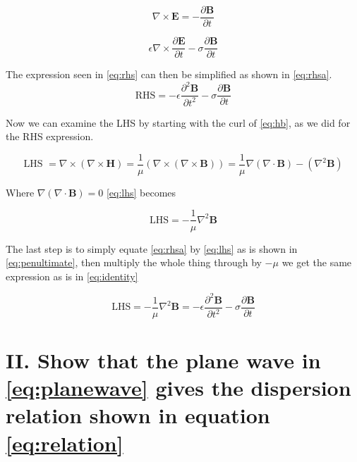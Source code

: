 \documentclass[12pt]{article}
\begin{document}
\begin{equation}
\label{eq:maxwell3}
\nabla \times \mathbf{E} = - \frac{\partial \mathbf{B}} {\partial t}
\end{equation}

\begin{equation}
\label{eq:rhs}
\epsilon \nabla \times\frac{\partial \mathbf{E}} {\partial t} -\sigma\frac{\partial \mathbf{B}} {\partial t} 
\end{equation}

The expression seen in \cref{eq:rhs}  can then be simplified as shown in \cref{eq:rhsa}.
\begin{equation}
\label{eq:rhsa}
\text{RHS}=-\epsilon\frac{\partial^{2} \mathbf{B}} {\partial t^{2}} - \sigma\frac{\partial \mathbf{B}} {\partial t}
\end{equation}

\noindent
Now we can examine the LHS by starting with the curl of \cref{eq:hb}, as we did for the RHS expression.

\begin{equation}
\label{eq:lhs}
\text{LHS }=\nabla \times (\nabla \times \mathbf{H} )=\frac{1}{\mu}(\nabla \times (\nabla \times \mathbf{B} ))=\frac{1}{\mu}\nabla(\nabla\cdot\mathbf{B})-(\nabla^{2}\mathbf{B})
\end{equation}

\noindent
Where $\nabla(\nabla\cdot\mathbf{B})=0$ \cref{eq:lhs} becomes 

\begin{equation}
\text{LHS}=-\frac{1}{\mu}\nabla^{2}\mathbf{B}
\end{equation}

\noindent
The last step is to simply equate \cref{eq:rhsa} by  \cref{eq:lhs} as is shown in \cref{eq:penultimate}, then multiply the whole thing through by $-\mu$ we get the same expression as is in \cref{eq:identity}



\begin{equation}
\label{eq:penultimate}
\text{LHS}=-\frac{1}{\mu}\nabla^{2}\mathbf{B}=-\epsilon\frac{\partial^{2} \mathbf{B}} {\partial t^{2}} - \sigma\frac{\partial \mathbf{B}} {\partial t}
\end{equation}



\section*{II. Show that the plane wave in \cref{eq:planewave} gives the dispersion relation shown in equation \cref{eq:relation} }
\end{document}
